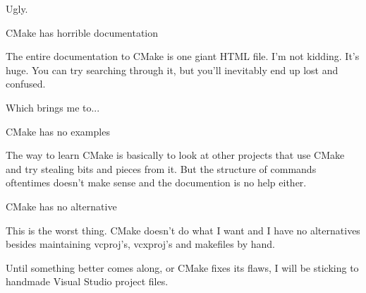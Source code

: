Ugly.


\begin{DoxyItemize}
\item CMake has horrible documentation
\end{DoxyItemize}

The entire documentation to CMake is one giant HTML file. I'm not kidding. It's huge. You can try searching through it, but you'll inevitably end up lost and confused.

Which brings me to...


\begin{DoxyItemize}
\item CMake has no examples
\end{DoxyItemize}

The way to learn CMake is basically to look at other projects that use CMake and try stealing bits and pieces from it. But the structure of commands oftentimes doesn't make sense and the documention is no help either.


\begin{DoxyItemize}
\item CMake has no alternative
\end{DoxyItemize}

This is the worst thing. CMake doesn't do what I want and I have no alternatives besides maintaining vcproj's, vcxproj's and makefiles by hand.

Until something better comes along, or CMake fixes its flaws, I will be sticking to handmade Visual Studio project files. 
